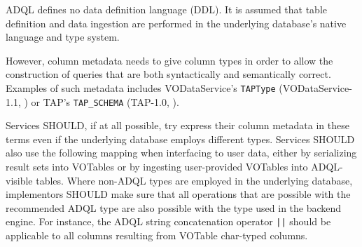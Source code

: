 \documentclass[11pt,a4paper]{ivoa}
\begin{document}
ADQL defines no data definition language (DDL).
It is assumed that table definition and data ingestion are performed in
the underlying database's native language and type system.

However, column metadata needs to give column types in order to allow the
construction of queries that are both syntactically and semantically correct.
Examples of such metadata includes VODataService's \verb:TAPType:
(VODataService-1.1, \citet{std:VODS11}) or TAP's \verb:TAP_SCHEMA: (TAP-1.0, \citet{std:TAP}).

Services SHOULD, if at all possible, try express their column metadata in
these terms even if the underlying database employs different types.
Services SHOULD also use the following mapping when interfacing to user data,
either by serializing result sets into VOTables or by ingesting user-provided
VOTables into ADQL-visible tables.
Where non-ADQL types are employed in the underlying database, implementors
SHOULD make sure that all operations that are possible with the recommended
ADQL type are also possible with the type used in the backend engine.
For instance, the ADQL string concatenation operator \verb:||: should be
applicable to all columns resulting from VOTable char-typed columns.
\end{document}
